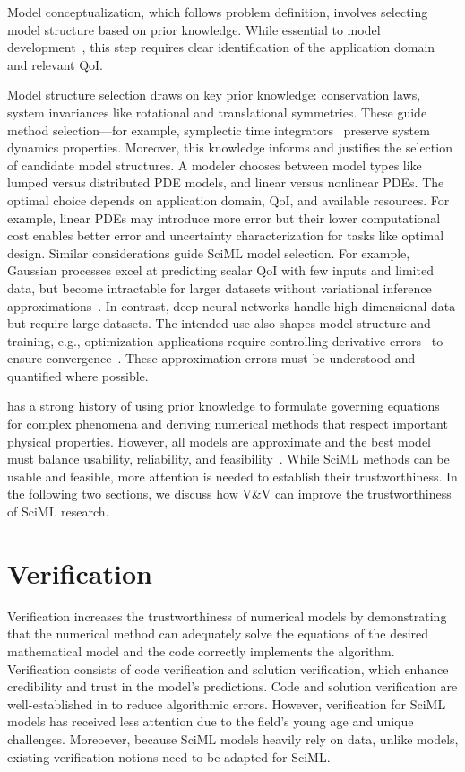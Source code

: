 Model conceptualization, which follows problem definition, involves selecting model structure based on prior knowledge. While essential to \CSE{} model development~\cite{Jakeman_LN_EMS_2006}, this step requires clear identification of the application domain and relevant QoI.

Model structure selection draws on key prior knowledge: conservation laws, system invariances like rotational and translational symmetries. These guide method selection---for example, symplectic time integrators~\cite{ruth1983canonical} preserve system dynamics properties. Moreover, this knowledge informs and justifies the selection of candidate model structures.
A \CSE{} modeler chooses between model types like lumped versus distributed PDE models, and linear versus nonlinear PDEs. The optimal choice depends on application domain, QoI, and available resources. For example, linear PDEs may introduce more error but their lower computational cost enables better error and uncertainty characterization for tasks like optimal design.
Similar considerations guide SciML model selection. For example, Gaussian processes excel at predicting scalar QoI with few inputs and limited data, but become intractable for larger datasets without variational inference approximations~\cite{Liu_CO_KBS_2018}. In contrast, deep neural networks handle high-dimensional data but require large datasets. The intended use also shapes model structure and training, e.g., optimization applications require controlling derivative errors~\cite{bouhlel2020scalable,o2024derivative} to ensure convergence~\cite{cao2024lazy,luo2023efficient}. These approximation errors must be understood and quantified where possible.

\CSE{} has a strong history of using prior knowledge to formulate governing equations for complex phenomena and deriving numerical methods that respect important physical properties. However, all models are approximate and the best model must balance usability, reliability, and feasibility~\cite{Hamilton_PSFJEMS_2022}. While SciML methods can be usable and feasible, more attention is needed to establish their trustworthiness. In the following two sections, we discuss how \CSE{} V\&V can improve the trustworthiness of SciML research.

\section{Verification}
\label{sec:verification}

Verification increases the trustworthiness of numerical models by demonstrating that the numerical method can adequately solve the equations of the desired mathematical model and the code correctly implements the algorithm. Verification consists of code verification and solution verification, which enhance credibility and trust in the model's predictions. Code and solution verification are well-established in \CSE{} to reduce algorithmic errors. However, verification for SciML models has received less attention due to the field's young age and unique challenges. Moreoever, because SciML models heavily rely on data, unlike \CSE{} models, existing \CSE{} verification notions need to be adapted for SciML.

